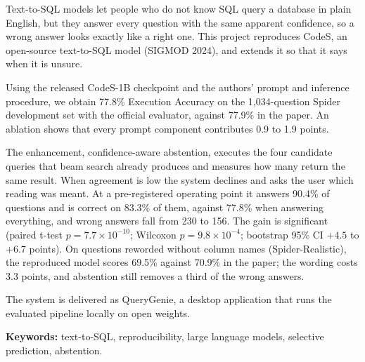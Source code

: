 Text-to-SQL models let people who do not know SQL query a database in plain English, but they answer every question with the same apparent confidence, so a wrong answer looks exactly like a right one. This project reproduces CodeS, an open-source text-to-SQL model (SIGMOD 2024), and extends it so that it says when it is unsure.

Using the released CodeS-1B checkpoint and the authors' prompt and inference procedure, we obtain 77.8\% Execution Accuracy on the 1,034-question Spider development set with the official evaluator, against 77.9\% in the paper. An ablation shows that every prompt component contributes 0.9 to 1.9 points.

The enhancement, confidence-aware abstention, executes the four candidate queries that beam search already produces and measures how many return the same result. When agreement is low the system declines and asks the user which reading was meant. At a pre-registered operating point it answers 90.4\% of questions and is correct on 83.3\% of them, against 77.8\% when answering everything, and wrong answers fall from 230 to 156. The gain is significant (paired t-test $p = 7.7 \times 10^{-10}$; Wilcoxon $p = 9.8 \times 10^{-4}$; bootstrap 95\% CI $+4.5$ to $+6.7$ points). On questions reworded without column names (Spider-Realistic), the reproduced model scores 69.5\% against 70.9\% in the paper; the wording costs 3.3 points, and abstention still removes a third of the wrong answers.

The system is delivered as QueryGenie, a desktop application that runs the evaluated pipeline locally on open weights.

\textbf{Keywords:} text-to-SQL, reproducibility, large language models, selective prediction, abstention.
